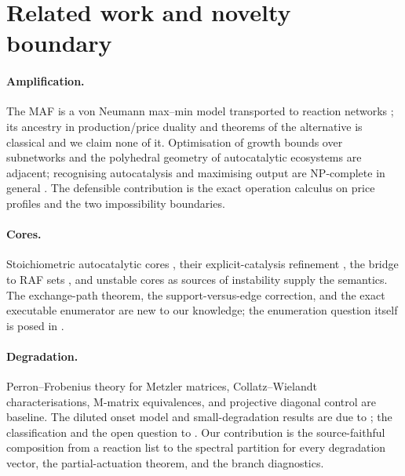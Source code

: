 \documentclass[11pt,a4paper]{article}
\theoremstyle{plain}
\theoremstyle{definition}
\theoremstyle{remark}
\begin{document}
\section{Related work and novelty boundary}\label{sec:related}

\paragraph{Amplification.} The MAF is a von Neumann max--min model \cite{vonneumann1945,kemeny1956} transported to reaction networks \cite{gagrani2026maf}; its ancestry in production/price duality and theorems of the alternative \cite{gordan1873,schrijver1986} is classical and we claim none of it. Optimisation of growth bounds over subnetworks and the polyhedral geometry of autocatalytic ecosystems \cite{gagrani2024} are adjacent; recognising autocatalysis and maximising output are NP-complete in general \cite{andersen2012}. The defensible contribution is the exact operation calculus on price profiles and the two impossibility boundaries.

\paragraph{Cores.} Stoichiometric autocatalytic cores \cite{blokhuis2020}, their explicit-catalysis refinement \cite{golnik2026cores}, the bridge to RAF sets \cite{golnik2026bridging}, and unstable cores as sources of instability \cite{vassena2024} supply the semantics. The exchange-path theorem, the support-versus-edge correction, and the exact executable enumerator are new to our knowledge; the enumeration question itself is posed in \cite{golnik2026cores}.

\paragraph{Degradation.} Perron--Frobenius theory for Metzler matrices, Collatz--Wielandt characterisations, M-matrix equivalences, and projective diagonal control \cite{bermanplemmons1994,farinarinaldi2000,ofir2022} are baseline. The diluted onset model and small-degradation results are due to \cite{unterberger2022}; the classification and the open question to \cite{nandan2026}. Our contribution is the source-faithful composition from a reaction list to the spectral partition for every degradation vector, the partial-actuation theorem, and the branch diagnostics.
\end{document}

